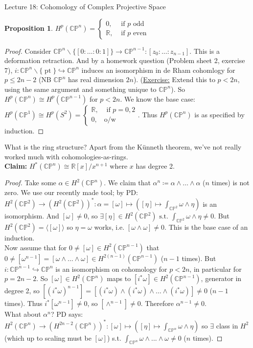 \documentclass[10pt]{article}
\theoremstyle{plain}
\newtheorem{prop}[thm]{Proposition}
\theoremstyle{definition}
\newcommand{\st}{\text{ s.t. }}
\newcommand{\myif}{\text{ if }}
\newcommand{\Claim}{\textbf{Claim: }}
\newcommand{\Real}{\mathbb{R}}
\newcommand{\CProj}{\mathbb{CP}}
\newcommand{\mycasesthing}[2]{\begin{cases} #1 \\ #2\end{cases}}
\DeclareMathOperator{\pt}{pt}
\begin{document}
\begin{section}{Lecture 18: Cohomology of Complex Projective Space}
\begin{prop}
$H^p(\CProj^n) = \mycasesthing{ 0,& \myif p \text{ odd}}{\Real, & \myif p \text{ even}} $
\end{prop}
\begin{proof}
Consider $\CProj^n \backslash \{ [0:\ldots:0:1]\} \to \CProj^{n-1} : [z_0: \ldots : z_{n-1}]$. This is a deformation retraction. And by a homework question (Problem sheet 2, exercise 7), $i : \CProj ^n \backslash \{\pt\} \hookrightarrow \CProj^n$ induces an isomorphism in de Rham cohomlogy for $p \leq 2n-2$ (NB $\CProj^n$ has real dimension $2n$). (\underline{Exercise:} Extend this to $p<2n$, using the same argument and something unique to $\CProj^n$). So $H^p(\CProj^n) \cong H^p(\CProj^{n-1})$ for $p<2n$. We know the base case: $H^p(\CProj^1) \cong  H^p(S^2) = \mycasesthing{\Real,& \myif p =0,2}{0,& \text{o/w}}$. Thus $H^p(\CProj^n)$ is as specified by induction.
\end{proof}
\noindent
What is the ring structure? Apart from the K\"unneth theorem, we've not really worked much with cohomologies-as-rings.\\
\Claim $H^*(\CProj^n) \cong \Real[x] / x^{n+1}$ where $x$ has degree 2.
 \begin{proof}
    Take some $\alpha \in H^2(\CProj^n)$. We claim that $\alpha^n \coloneqq \alpha\wedge\ldots\wedge\alpha$ ($n$ times) is not zero. We use our recently made tool; by PD: $H^2(\CProj^2) \to (H^2(\CProj^2))^* : \alpha = [\omega] \mapsto ([\eta] \mapsto \int_{\CProj^2} \omega \wedge \eta)$ is an isomorphism. And $[\omega] \neq 0$, so $\exists [\eta] \in H^2(\CProj^2) \st \int_{\CProj^2} \omega \wedge \eta \neq 0$. But $H^2(\CProj^2) = \langle [\omega]\rangle$ so $\eta = \omega$ works, i.e. $[\omega \wedge \omega] \neq 0$. This is the base case of an induction.\\
    Now assume that for $0\neq [\omega] \in H^2(\CProj^{n-1})$ that $0 \neq[ \omega^{n-1}]= [\omega \wedge \ldots \wedge \omega] \in H^{2(n-1)}(\CProj^{n-1})$ ($n-1$ times). But $i : \CProj^{n-1} \hookrightarrow \CProj^n$ is an isomorphism on cohomology for $p < 2n$, in particular for $p = 2n-2$. So $[\omega] \in H^2(\CProj^n)$ maps to $[i^*\omega] \in H^2(\CProj^{n-1})$, generator in degree 2, so $[(i^*\omega)^{n-1}]= [(i^*\omega) \wedge(i^*\omega) \wedge \ldots \wedge (i^*\omega)] \neq 0$ ($n-1$ times). Thus $i^*[\omega^{n-1}] \neq 0$, so $[\wedge^{n-1}] \neq 0$. Therefore $\alpha^{n-1} \neq 0$.  \\
    What about $\alpha^n$? PD says: $H^2(\CProj^n) \to (H^{2n-2}(\CProj^n))^* : [\omega] \mapsto ([\eta] \mapsto \int_{\CProj^n} \omega \wedge \eta)$ so $\exists$ class in $H^2$ (which up to scaling must be $[\omega]$) s.t. $\int_{\CProj^n} \omega \wedge ... \wedge \omega \neq 0$ ($n$ times).
 \end{proof}
\end{section}
\end{document}
